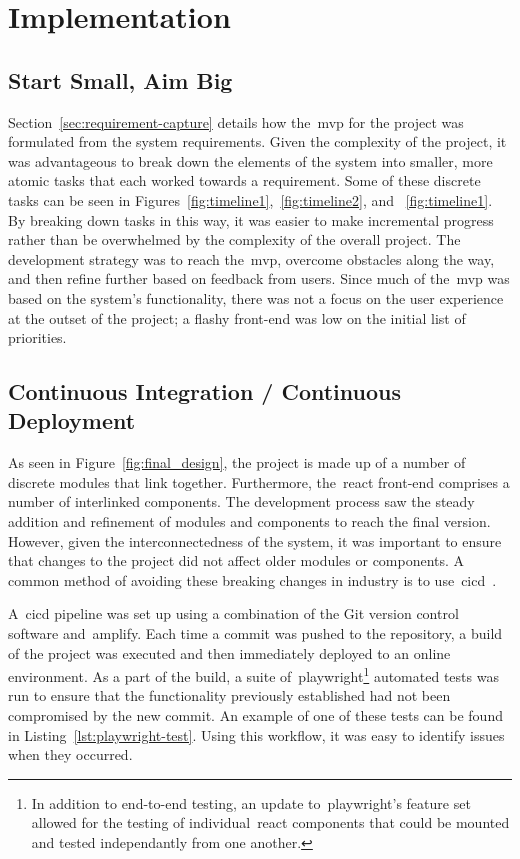 \thispagestyle{plain}
\newpage
\section{Implementation}\label{sec:implementation}

\normalsize

\subsection{Start Small, Aim Big}\label{subsec:start-small-aim-big}

Section~\ref{sec:requirement-capture} details how the~\gls{mvp} for the project was formulated from the system requirements.
Given the complexity of the project,
it was advantageous to break down the elements of the system into smaller,
more atomic tasks that each worked towards a requirement.
Some of these discrete tasks can be seen in Figures~\ref{fig:timeline1},~\ref{fig:timeline2}, and ~\ref{fig:timeline1}.
By breaking down tasks in this way,
it was
easier to make incremental progress
rather than be overwhelmed by the complexity of the overall project.
The development strategy was to reach the~\gls{mvp}, overcome obstacles along the way,
and then refine further based on feedback from users.
Since much of the~\gls{mvp} was based on the system's functionality,
there was not a focus on the user experience at the outset of the project;
a flashy front-end was low on the initial list of priorities.

\subsection{Continuous Integration / Continuous Deployment}\label{subsec:continuous-integration-continuous-deployment}

As seen in Figure~\ref{fig:final_design}, the project is made up of a number of discrete modules that link together.
Furthermore, the~\gls{react} front-end comprises a number of interlinked components.
The development process saw the steady addition and refinement of modules and components to reach the final version.
However, given the interconnectedness of the system,
it was important to ensure that changes to the project did not affect older modules or components.
A common method of avoiding these breaking changes in industry is
to use~\gls{cicd}~\citep{duvall2007continuous, miller-ci}.

A~\gls{cicd} pipeline was set up using a combination of the Git version control software and~\gls{amplify}.
Each time a commit was pushed to the repository,
a build of the project was executed and then immediately deployed to an online environment.
As a part of the build,
a suite of~\gls{playwright}\footnote{In addition to end-to-end testing, an update to~\gls{playwright}'s feature set allowed for the testing of individual~\gls{react} components that could be mounted and tested independantly from one another.} automated tests was run
to ensure that the functionality previously established had not been compromised by the new commit.
An example of one of these tests can be found in Listing~\ref{lst:playwright-test}.
Using this workflow, it was easy to identify issues when they occurred.

